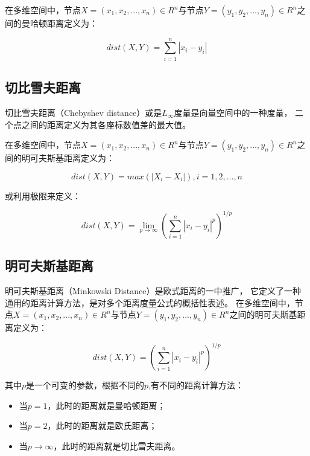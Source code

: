 在多维空间中，节点$X = (x_1, x_2, ..., x_n) \in R ^ n$与节点$Y = (y_1, y_2, ..., y_n) \in R ^ n$之间的曼哈顿距离定义为：

\begin{equation}
    dist(X, Y) = \sum_{i=1}^{n} |x_i - y_i|
\end{equation}

\subsection{切比雪夫距离}

切比雪夫距离（Chebyshev distance）或是$L_\infty$度量是向量空间中的一种度量，
二个点之间的距离定义为其各座标数值差的最大值。

在多维空间中，节点$X = (x_1, x_2, ..., x_n) \in R ^ n$与节点$Y = (y_1, y_2, ..., y_n) \in R ^ n$之间的明可夫斯基距离定义为：

\begin{equation}
    dist(X, Y) = max(|X_i - X_i|), i = 1, 2, ..., n
\end{equation}

或利用极限来定义：

\begin{equation}
    dist(X, Y) = \lim_{p \rightarrow \infty}(\sum_{i=1}^{n} |x_i - y_i|^p)^{1/p}
\end{equation}

\subsection{明可夫斯基距离}

明可夫斯基距离（Minkowski Distance）是欧式距离的一中推广，
它定义了一种通用的距离计算方法，是对多个距离度量公式的概括性表述。
在多维空间中，节点$X = (x_1, x_2, ..., x_n) \in R ^ n$与节点$Y = (y_1, y_2, ..., y_n) \in R ^ n$之间的明可夫斯基距离定义为：

\begin{equation}
    dist(X, Y) = (\sum_{i=1}^{n} |x_i - y_i|^p)^{1/p}
\end{equation}

其中$p$是一个可变的参数，根据不同的$p$,有不同的距离计算方法：

\begin{itemize}
    \item 当$p = 1$，此时的距离就是曼哈顿距离；
    \item 当$p = 2$，此时的距离就是欧氏距离；
    \item 当$p \rightarrow \infty$，此时的距离就是切比雪夫距离。
\end{itemize}

